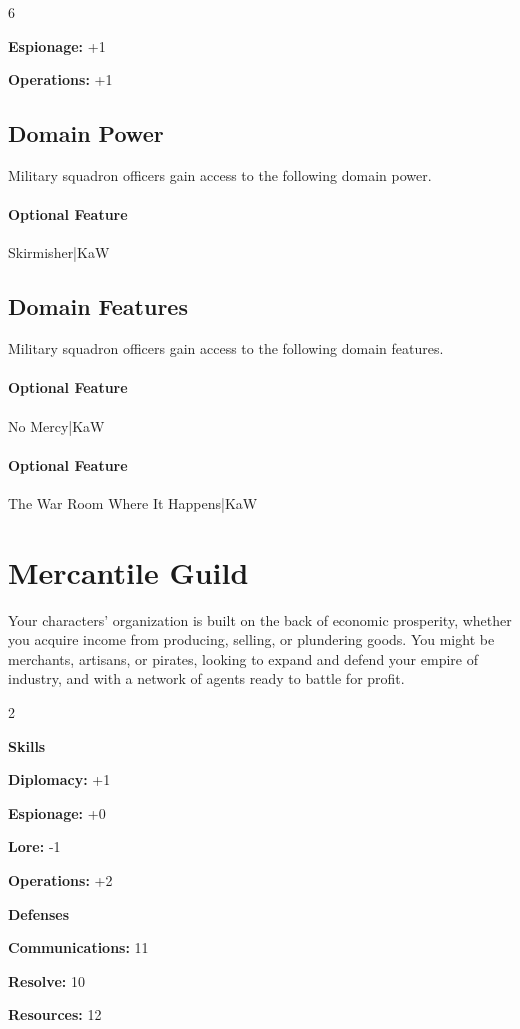 \documentclass[10pt,a4paper,twoside,bg=print,twocolumn,openany,nodeprecatedcode]{dndbook}
\begin{document}
\begin{itemize}
\begin{multicols}{6}
\item \textbf{Espionage:} +1
\item \textbf{Operations:} +1
\end{multicols}

\end{itemize}

\subsection{Domain Power}
Military squadron officers gain access to the following domain power.

\paragraph{Optional Feature}
Skirmisher|KaW

\subsection{Domain Features}
Military squadron officers gain access to the following domain features.

\paragraph{Optional Feature}
No Mercy|KaW

\paragraph{Optional Feature}
The War Room Where It Happens|KaW

\section{Mercantile Guild}
Your characters' organization is built on the back of economic prosperity, whether you acquire income from producing, selling, or plundering goods. You might be merchants, artisans, or pirates, looking to expand and defend your empire of industry, and with a network of agents ready to battle for profit.


\begin{itemize}
\begin{multicols}{2}
\item \textbf{Skills}
\item \textbf{Diplomacy:} +1
\item \textbf{Espionage:} +0
\item \textbf{Lore:} -1
\item \textbf{Operations:} +2
\item \textbf{Defenses}
\item \textbf{Communications:} 11
\item \textbf{Resolve:} 10
\item \textbf{Resources:} 12
\end{multicols}

\end{itemize}
\end{document}
